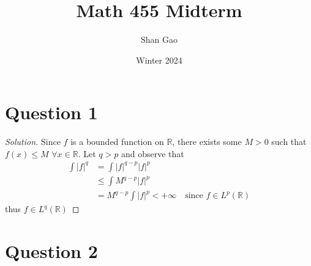 \documentclass[12pt]{article}
\title{Math 455 Midterm}
\author{Shan Gao}
\date{Winter 2024}
\newcommand\abs[1]{\left| #1 \right|} %
\begin{document}
\maketitle


\section*{Question 1}
\begin{proof}[Solution]
	Since $f$ is a bounded function on $\mathbb{R}$, there exists some $M > 0$ such that $f(x) \leq M$ $\forall x \in \mathbb{R}$. Let $q > p$ and observe that 
	\begin{align*}
		\int \abs{f}^q &= \int \abs{f}^{q-p} \abs{f}^p\\
		&\leq \int M^{q-p} \abs{f}^p \\
		&= M^{q-p} \int \abs{f}^p < +\infty \quad \text{since $f \in L^p(\mathbb{R})$}
	\end{align*}
	thus $f \in L^q(\mathbb{R})$
\end{proof}
\pagebreak
\section*{Question 2}
\end{document}
